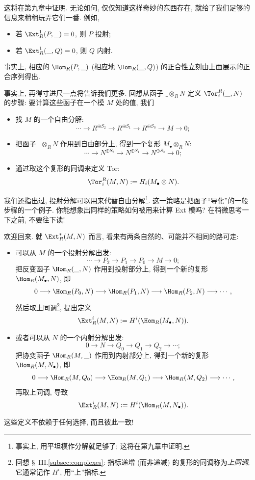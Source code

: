 这将在第九章中证明. 无论如何, 仅仅知道这样奇妙的东西存在, 就给了我们足够的信息来稍稍玩弄它们一番. 例如,
\begin{itemize}
\item[---] 若 $\Ext_R^1(P,\_)=0$, 则 $P$ 投射;
\item[---] 若 $\Ext_R^1(\_,Q)=0$, 则 $Q$ 内射.
\end{itemize}
事实上, 相应的 $\Hom_R(P,\_)$ (相应地 $\Hom_R(\_,Q)$) 的正合性立刻由上面展示的正合序列得出.

事实上, 再得寸进尺一点将告诉我们更多. 回想从函子 $\_\otimes_R N$ 定义 $\Tor_i^R(\_,N)$ 的步骤: 要计算这些函子在一个模 $M$ 处的值, 我们
\begin{itemize}
\item 找 $M$ 的一个自由分解:
\[
\cdots\longrightarrow R^{\oplus S_2}\longrightarrow R^{\oplus S_1}\longrightarrow R^{\oplus S_0}\longrightarrow M\longrightarrow 0;
\]
\item 把函子 $\_\otimes_R N$ 作用到自由部分上, 得到一个复形 $M_\bullet\otimes_R N$:
\[
\cdots\longrightarrow N^{\oplus S_2}\longrightarrow N^{\oplus S_1}\longrightarrow N^{\oplus S_0}\longrightarrow 0;
\]
\item 通过取这个复形的同调来定义 Tor:
\[
\Tor_i^R(M,N):=H_i(M_\bullet\otimes N).
\]
\end{itemize}
我们还指出过, 投射分解可以用来代替自由分解\footnote{事实上, 用平坦模作分解就足够了; 这将在第九章中证明.}. 这一策略是把函子``导化''的一般步骤的一个例子. 你能想象出同样的策略如何被用来计算 Ext 模吗? 在稍微思考一下之前, 不要往下读!

欢迎回来. 就 $\Ext_R^*(M,N)$ 而言, 看来有两条自然的、可能并不相同的路可走:
\begin{itemize}
\item[---] 可以从 $M$ 的一个投射分解出发:
\[
\cdots\longrightarrow P_2\longrightarrow P_1\longrightarrow P_0\longrightarrow M\longrightarrow 0;
\]
把反变函子 $\Hom_R(\_,N)$ 作用到投射部分上, 得到一个新的复形 $\Hom_R(M_\bullet,N)$, 即
\[
0\longrightarrow\Hom_R(P_0,N)\longrightarrow\Hom_R(P_1,N)\longrightarrow\Hom_R(P_2,N)\longrightarrow\cdots,
\]
然后取上同调\footnote{回想 \S~III.\ref{subsec:complexes}: 指标递增 (而非递减) 的复形的同调称为\emph{上同调}; 它通常记作 $H^i$, 用``上''指标.}, 提出定义
\[
\Ext_R^i(M,N):=H^i(\Hom_R(M_\bullet,N)).
\]
\item[---] 或者可以从 $N$ 的一个内射分解出发:
\[
0\longrightarrow N\longrightarrow Q_0\longrightarrow Q_1\longrightarrow Q_2\longrightarrow\cdots;
\]
把协变函子 $\Hom_R(M,\_)$ 作用到内射部分上, 得到一个新的复形 $\Hom_R(M,N_\bullet)$, 即
\[
0\longrightarrow\Hom_R(M,Q_0)\longrightarrow\Hom_R(M,Q_1)\longrightarrow\Hom_R(M,Q_2)\longrightarrow\cdots,
\]
再取上同调, 导致
\[
\Ext_R^i(M,N):=H^i(\Hom_R(M,N_\bullet)).
\]
\end{itemize}
这些定义不依赖于任何选择, 而且彼此一致!


